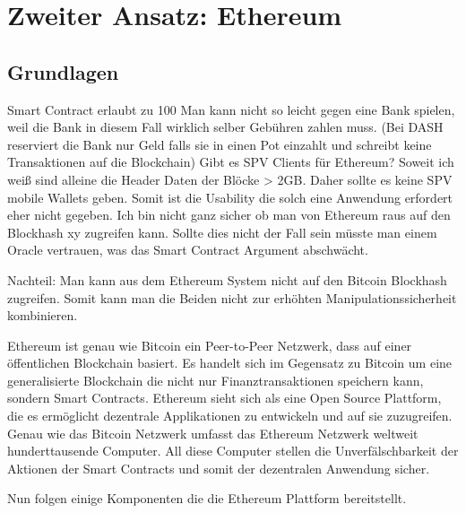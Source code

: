 \chapter{Zweiter Ansatz: Ethereum} %

\label{eth} %

\section{Grundlagen}
\iffalse
    Smart Contract erlaubt zu 100%
    Man kann nicht so leicht gegen eine Bank spielen, weil die Bank in diesem Fall wirklich selber Gebühren zahlen muss. (Bei DASH reserviert die Bank nur Geld falls sie in einen Pot einzahlt und schreibt keine Transaktionen auf die Blockchain)
    Gibt es SPV Clients für Ethereum? Soweit ich weiß sind alleine die Header Daten der Blöcke > 2GB. Daher sollte es keine SPV mobile Wallets geben. Somit ist die Usability die solch eine Anwendung erfordert eher nicht gegeben.
    Ich bin nicht ganz sicher ob man von Ethereum raus auf den Blockhash xy zugreifen kann. Sollte dies nicht der Fall sein müsste man einem Oracle vertrauen, was das Smart Contract Argument abschwächt.
    
Nachteil: Man kann aus dem Ethereum System nicht auf den Bitcoin Blockhash zugreifen. Somit kann man die Beiden nicht zur erhöhten Manipulationssicherheit kombinieren.
\vspace{2cm}

Ethereum ist genau wie Bitcoin ein Peer-to-Peer Netzwerk, dass auf einer öffentlichen Blockchain basiert. Es handelt sich im Gegensatz zu Bitcoin um eine generalisierte Blockchain die nicht nur Finanztransaktionen speichern kann, sondern Smart Contracts. Ethereum sieht sich als eine Open Source Plattform, die es ermöglicht dezentrale Applikationen zu entwickeln und auf sie zuzugreifen. Genau wie das Bitcoin Netzwerk umfasst das Ethereum Netzwerk weltweit hunderttausende Computer. All diese Computer stellen die Unverfälschbarkeit der Aktionen der Smart Contracts und somit der dezentralen Anwendung sicher.

Nun folgen einige Komponenten die die Ethereum Plattform bereitstellt.

